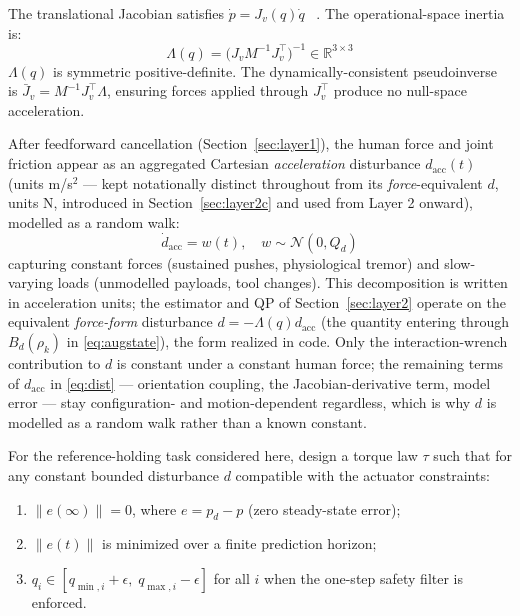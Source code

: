 \documentclass[journal]{IEEEtran}
\newcommand{\Jvb}{\bar{J}_v}
\begin{document}
The translational Jacobian satisfies $\dot{p}=J_v(q)\dot{q}$~%
\cite{siciliano2009robotics}.
The operational-space inertia~\cite{khatib1987unified} is:
\begin{equation}\label{eq:Lambda}
  \Lambda(q)=\bigl(J_vM^{-1}J_v^\top\bigr)^{-1}\in\mathbb{R}^{3\times3}
\end{equation}
$\Lambda(q)$ is symmetric positive-definite.
The dynamically-consistent
pseudoinverse~\cite{khatib1987unified,sentis2005synthesis} is
$\Jvb=M^{-1}J_v^\top\Lambda$, ensuring forces applied through
$J_v^\top$ produce no null-space acceleration.

After feedforward cancellation (Section~\ref{sec:layer1}), the human
force and joint friction appear as an aggregated Cartesian
\emph{acceleration} disturbance $d_{\text{acc}}(t)$ (units m/s$^2$ ---
kept notationally distinct throughout from its \emph{force}-equivalent
$d$, units N, introduced in Section~\ref{sec:layer2c} and used from Layer
2 onward), modelled as a random walk:
\begin{equation}\label{eq:distmodel}
  \dot{d}_{\text{acc}}=w(t),\quad w\sim\mathcal{N}(0,Q_d)
\end{equation}
capturing constant forces (sustained pushes, physiological tremor) and
slow-varying loads (unmodelled payloads, tool changes).
This decomposition is written in acceleration units; the estimator and QP of
Section~\ref{sec:layer2} operate on the equivalent \emph{force-form}
disturbance $d=-\Lambda(q)d_{\mathrm{acc}}$ (the quantity entering through $B_d(\rho_k)$ in
\eqref{eq:augstate}), the form realized in code. Only the interaction-wrench
contribution to $d$ is constant under a constant human force; the remaining
terms of $d_{\text{acc}}$ in \eqref{eq:dist} --- orientation coupling, the
Jacobian-derivative term, model error --- stay configuration- and
motion-dependent regardless, which is why $d$ is modelled as a random walk
rather than a known constant.

For the reference-holding task considered here, design a torque law $\tau$
such that for any constant bounded disturbance $d$ compatible with the
actuator constraints:
\begin{enumerate}
  \item $\|e(\infty)\|=0$, where $e=p_d-p$ (zero steady-state error);
  \item $\|e(t)\|$ is minimized over a finite prediction horizon;
  \item $q_i\in[q_{\min,i}+\epsilon,\;q_{\max,i}-\epsilon]$
        for all $i$ when the one-step safety filter is enforced.
\end{enumerate}
\end{document}
